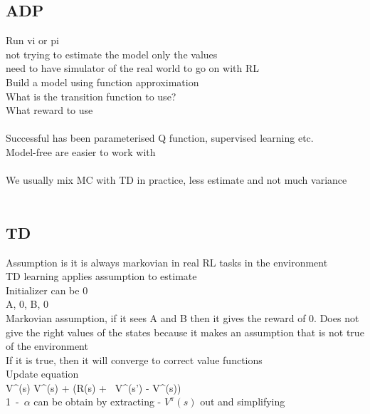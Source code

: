 \documentclass[11pt]{article}
\begin{document}
\subsection*{ADP}
Run vi or pi\\
not trying to estimate the model only the values
\\
need to have simulator of the real world to go on with RL
\\
Build a model using function approximation\\
What is the transition function to use?\\
What reward to use\\
\\
Successful has been parameterised Q function, supervised learning etc.
\\
Model-free are easier to work with\\
\\
We usually mix MC with TD in practice, less estimate and not much variance\\
\\
\subsection*{TD}
Assumption is it is always markovian in real RL tasks in the environment\\
TD learning applies assumption to estimate\\
Initializer can be 0\\
A, 0, B, 0\\
Markovian assumption, if it sees A and B then it gives the reward of 0.
Does not give the right values of the states because it makes an assumption that is not true of the environment\\
If it is true, then it will converge to  correct value functions\\
Update equation\\
 V^{\pi}(s) \leftarrow V^{\pi}(s) + \alpha(R(s) + \gamma\ V^{\pi}(s') - V^{\pi}(s))
 \\
 1\ -\ $\alpha$ can be obtain by extracting - $V^{\pi}(s)$ out and simplifying
\end{document}
